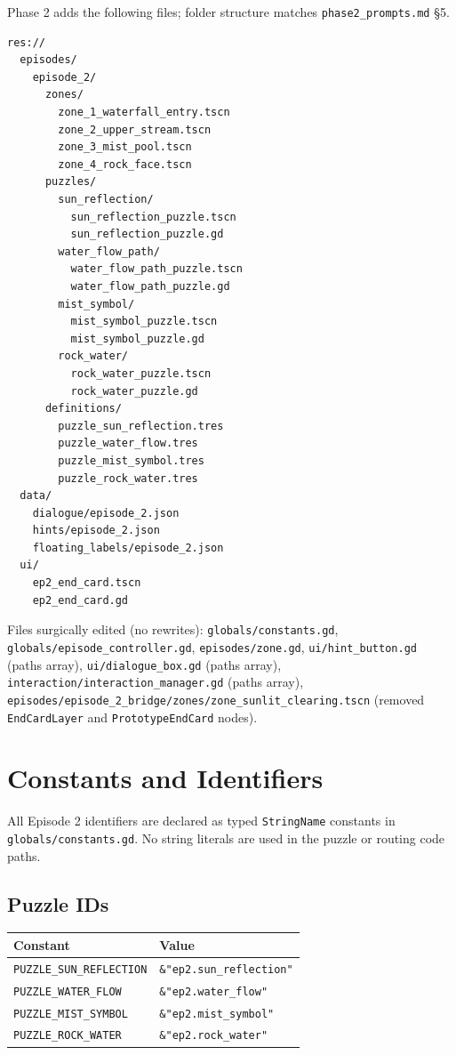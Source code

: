 \documentclass[12pt, a4paper]{article}
\begin{document}
Phase 2 adds the following files; folder structure matches
\texttt{phase2\_prompts.md} \S5.

\begin{lstlisting}
res://
  episodes/
    episode_2/
      zones/
        zone_1_waterfall_entry.tscn
        zone_2_upper_stream.tscn
        zone_3_mist_pool.tscn
        zone_4_rock_face.tscn
      puzzles/
        sun_reflection/
          sun_reflection_puzzle.tscn
          sun_reflection_puzzle.gd
        water_flow_path/
          water_flow_path_puzzle.tscn
          water_flow_path_puzzle.gd
        mist_symbol/
          mist_symbol_puzzle.tscn
          mist_symbol_puzzle.gd
        rock_water/
          rock_water_puzzle.tscn
          rock_water_puzzle.gd
      definitions/
        puzzle_sun_reflection.tres
        puzzle_water_flow.tres
        puzzle_mist_symbol.tres
        puzzle_rock_water.tres
  data/
    dialogue/episode_2.json
    hints/episode_2.json
    floating_labels/episode_2.json
  ui/
    ep2_end_card.tscn
    ep2_end_card.gd
\end{lstlisting}

Files surgically edited (no rewrites): \texttt{globals/constants.gd},
\texttt{globals/episode\_controller.gd}, \texttt{episodes/zone.gd},
\texttt{ui/hint\_button.gd} (paths array), \texttt{ui/dialogue\_box.gd}
(paths array), \texttt{interaction/interaction\_manager.gd} (paths array),
\texttt{episodes/episode\_2\_bridge/zones/zone\_sunlit\_clearing.tscn}
(removed \texttt{EndCardLayer} and \texttt{PrototypeEndCard} nodes).

\section{Constants and Identifiers}

All Episode 2 identifiers are declared as typed \texttt{StringName} constants
in \texttt{globals/constants.gd}. No string literals are used in the puzzle
or routing code paths.

\subsection{Puzzle IDs}

\begin{center}
\begin{tabular}{ll}
\toprule
\textbf{Constant} & \textbf{Value} \\
\midrule
\texttt{PUZZLE\_SUN\_REFLECTION} & \texttt{\&"ep2.sun\_reflection"} \\
\texttt{PUZZLE\_WATER\_FLOW}     & \texttt{\&"ep2.water\_flow"} \\
\texttt{PUZZLE\_MIST\_SYMBOL}    & \texttt{\&"ep2.mist\_symbol"} \\
\texttt{PUZZLE\_ROCK\_WATER}     & \texttt{\&"ep2.rock\_water"} \\
\bottomrule
\end{tabular}
\end{center}
\end{document}
